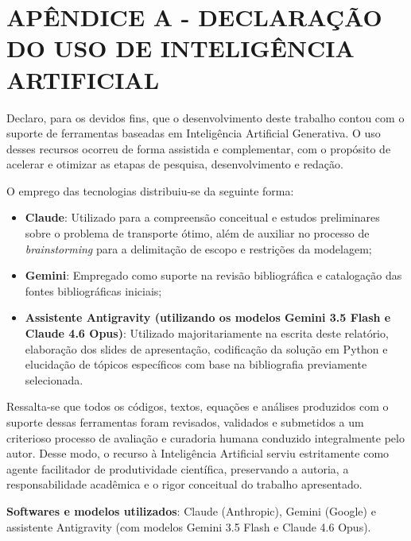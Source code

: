 \section*{\centering APÊNDICE A - DECLARAÇÃO DO USO DE INTELIGÊNCIA ARTIFICIAL}


\vspace{1cm}

Declaro, para os devidos fins, que o desenvolvimento deste trabalho contou com o suporte de ferramentas baseadas em Inteligência Artificial Generativa. O uso desses recursos ocorreu de forma assistida e complementar, com o propósito de acelerar e otimizar as etapas de pesquisa, desenvolvimento e redação.

O emprego das tecnologias distribuiu-se da seguinte forma:
\begin{itemize}
  \item \textbf{Claude}: Utilizado para a compreensão conceitual e estudos preliminares sobre o problema de transporte ótimo, além de auxiliar no processo de \textit{brainstorming} para a delimitação de escopo e restrições da modelagem;
  \item \textbf{Gemini}: Empregado como suporte na revisão bibliográfica e catalogação das fontes bibliográficas iniciais;
  \item \textbf{Assistente Antigravity (utilizando os modelos Gemini 3.5 Flash e Claude 4.6 Opus)}: Utilizado majoritariamente na escrita deste relatório, elaboração dos slides de apresentação, codificação da solução em Python e elucidação de tópicos específicos com base na bibliografia previamente selecionada.
\end{itemize}

Ressalta-se que todos os códigos, textos, equações e análises produzidos com o suporte dessas ferramentas foram revisados, validados e submetidos a um criterioso processo de avaliação e curadoria humana conduzido integralmente pelo autor. Desse modo, o recurso à Inteligência Artificial serviu estritamente como agente facilitador de produtividade científica, preservando a autoria, a responsabilidade acadêmica e o rigor conceitual do trabalho apresentado.

\vspace{1.5cm}

\noindent \textbf{Softwares e modelos utilizados}: Claude (Anthropic), Gemini (Google) e assistente Antigravity (com modelos Gemini 3.5 Flash e Claude 4.6 Opus).